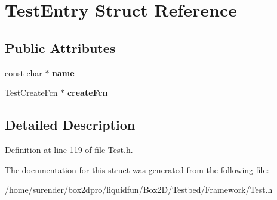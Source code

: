 \hypertarget{structTestEntry}{\section{Test\-Entry Struct Reference}
\label{structTestEntry}
}
\subsection*{Public Attributes}
\begin{DoxyCompactItemize}
\item 
\hypertarget{structTestEntry_a2c841786ab1811e11efc21c1d67dc9c5}{const char $\ast$ {\bfseries name}}\label{structTestEntry_a2c841786ab1811e11efc21c1d67dc9c5}

\item 
\hypertarget{structTestEntry_a238e2d72474c8a5e02113aa233967268}{Test\-Create\-Fcn $\ast$ {\bfseries create\-Fcn}}\label{structTestEntry_a238e2d72474c8a5e02113aa233967268}

\end{DoxyCompactItemize}


\subsection{Detailed Description}


Definition at line 119 of file Test.\-h.



The documentation for this struct was generated from the following file\-:\begin{DoxyCompactItemize}
\item 
/home/surender/box2dpro/liquidfun/\-Box2\-D/\-Testbed/\-Framework/Test.\-h\end{DoxyCompactItemize}
